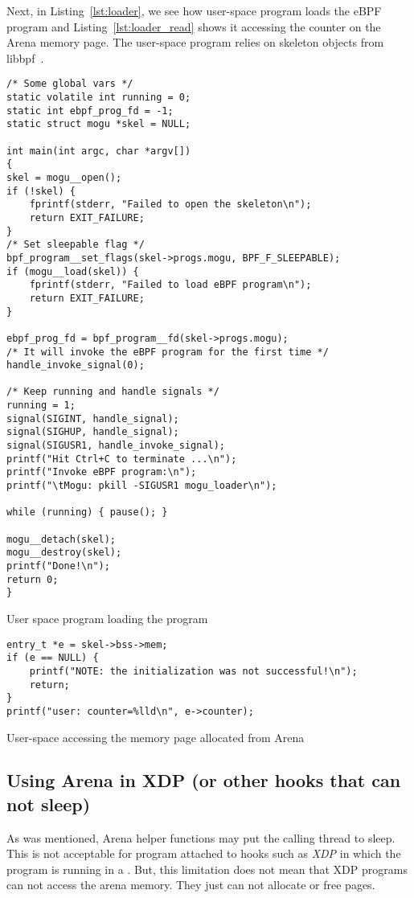 \documentclass{article}
\begin{document}
Next, in Listing~\ref{lst:loader}, we see how user-space program loads the eBPF
program and Listing~\ref{lst:loader_read} shows it accessing the counter on the
Arena memory page. The user-space program relies on skeleton objects from
libbpf~\cite{libbpf_skeleton}.

\begin{listing}
\begin{verbatim}
/* Some global vars */
static volatile int running = 0;
static int ebpf_prog_fd = -1;
static struct mogu *skel = NULL;

int main(int argc, char *argv[])
{
skel = mogu__open();
if (!skel) {
    fprintf(stderr, "Failed to open the skeleton\n");
    return EXIT_FAILURE;
}
/* Set sleepable flag */
bpf_program__set_flags(skel->progs.mogu, BPF_F_SLEEPABLE);
if (mogu__load(skel)) {
    fprintf(stderr, "Failed to load eBPF program\n");
    return EXIT_FAILURE;
}

ebpf_prog_fd = bpf_program__fd(skel->progs.mogu);
/* It will invoke the eBPF program for the first time */
handle_invoke_signal(0);

/* Keep running and handle signals */
running = 1;
signal(SIGINT, handle_signal);
signal(SIGHUP, handle_signal);
signal(SIGUSR1, handle_invoke_signal);
printf("Hit Ctrl+C to terminate ...\n");
printf("Invoke eBPF program:\n");
printf("\tMogu: pkill -SIGUSR1 mogu_loader\n");

while (running) { pause(); }

mogu__detach(skel);
mogu__destroy(skel);
printf("Done!\n");
return 0;
}
\end{verbatim}
\caption{User space program loading the program}
\label{lst:loader}
\end{listing}

\begin{listing}
\begin{verbatim}
entry_t *e = skel->bss->mem;
if (e == NULL) {
    printf("NOTE: the initialization was not successful!\n");
    return;
}
printf("user: counter=%lld\n", e->counter);
\end{verbatim}
\caption{User-space accessing the memory page allocated from Arena}
\label{lst:loader_read}
\end{listing}


\subsection{Using Arena in XDP (or other hooks that can not sleep)}

As was mentioned, Arena helper functions may put the calling thread to sleep.
This is not acceptable for program attached to hooks such as \emph{XDP} in
which the program is running in a . But, this limitation does not mean
that XDP programs can not access the arena memory. They just can not allocate or
free pages.
\end{document}
